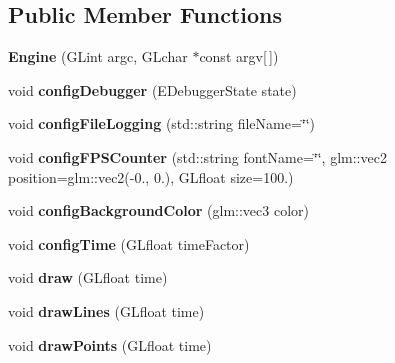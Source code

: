\subsection*{Public Member Functions}
\begin{DoxyCompactItemize}
\item 
\mbox{\label{classflw_1_1Engine_a8efacbf047d08cc6e04cf81af63bcc4f}} 
{\bfseries Engine} (G\+Lint argc, G\+Lchar $\ast$const argv\mbox{[}$\,$\mbox{]})
\item 
\mbox{\label{classflw_1_1Engine_ae38d212ba4bad19654d080b48e58e5a6}} 
void {\bfseries config\+Debugger} (E\+Debugger\+State state)
\item 
\mbox{\label{classflw_1_1Engine_ab7c9423b53e553e0cf8932c7a8e6a3c1}} 
void {\bfseries config\+File\+Logging} (std\+::string file\+Name=\char`\"{}\char`\"{})
\item 
\mbox{\label{classflw_1_1Engine_ac155824c8e1f16457f8788836eb9d0d3}} 
void {\bfseries config\+F\+P\+S\+Counter} (std\+::string font\+Name=\char`\"{}\char`\"{}, glm\+::vec2 position=glm\+::vec2(-\/0., 0.), G\+Lfloat size=100.)
\item 
\mbox{\label{classflw_1_1Engine_a095771e29420c83636acb355701e0751}} 
void {\bfseries config\+Background\+Color} (glm\+::vec3 color)
\item 
\mbox{\label{classflw_1_1Engine_ac35ea4a508bc9bda596b84d9dc6a0ca3}} 
void {\bfseries config\+Time} (G\+Lfloat time\+Factor)
\item 
\mbox{\label{classflw_1_1Engine_a65d5d45571a4a9831da5954b2848e7eb}} 
void {\bfseries draw} (G\+Lfloat time)
\item 
\mbox{\label{classflw_1_1Engine_ad9bbbabe65c1c59a3b9ace8900ade8f3}} 
void {\bfseries draw\+Lines} (G\+Lfloat time)
\item 
\mbox{\label{classflw_1_1Engine_af5d70bafff4bb7a38a59805f6e1f3c18}} 
void {\bfseries draw\+Points} (G\+Lfloat time)
\item 
\mbox{\label{classflw_1_1Engine_a0f9be72217d6d7b75e3733ca5d84b017}} 

\end{DoxyCompactItemize}
